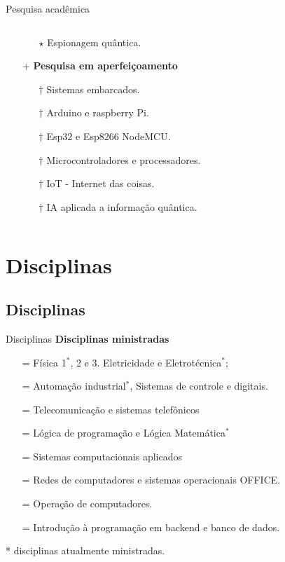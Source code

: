 \documentclass{beamer}
\begin{document}
\begin{frame}{Pesquisa acadêmica}
\begin{columns}[T]
\begin{column}{.8\textwidth}
\begin{itemize}
\begin{itemize}
                    \item [$\star$] Espionagem quântica.
                \end{itemize}
                \pause
                \item [+] \textbf{Pesquisa em aperfeiçoamento}
                \begin{itemize}
                    \item [$\dagger$] Sistemas embarcados.
                    \item [$\dagger$] Arduino e raspberry Pi.
                    \item [$\dagger$] Esp32 e Esp8266 NodeMCU.
                    \item [$\dagger$] Microcontroladores e processadores.
                    \item [$\dagger$] IoT - Internet das coisas.
                    \item [$\dagger$] IA aplicada a informação quântica.
                \end{itemize} 
            \end{itemize}
        \end{column}
    \end{columns}
\end{frame}
\section{Disciplinas}
%
\subsection{Disciplinas}
%
\begin{frame}{Disciplinas}
    \transblindshorizontal
    \textbf{Disciplinas ministradas}
        \begin{itemize}
            \item [=] Física 1$^*$, 2 e 3. Eletricidade e Eletrotécnica$^*$;
            \item [=] Automação industrial$^*$, Sistemas de controle e digitais.
            \item [=] Telecomunicação e sistemas telefônicos
            \item [=] Lógica de programação e Lógica Matemática$^*$
            \item [=] Sistemas computacionais aplicados
            \item [=] Redes de computadores e sistemas operacionais OFFICE.
            \item [=] Operação de computadores.
            \item [=] Introdução à programação em backend e banco de dados.
        \end{itemize}
        * disciplinas atualmente ministradas.
\end{frame}
%
\end{document}

